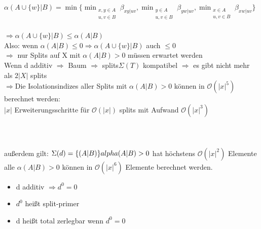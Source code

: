 $\alpha(A\cup\{w\}|B)=\min \{ \displaystyle\min_{\substack{x,y \in A \\ u,v \in B}} \beta_{xy|uv}, \displaystyle\min_{\substack{y \in A \\ u,v \in B}} \beta_{yw|uv}, \displaystyle\min_{\substack{x \in A \\ u,v \in B}} \beta_{xw|uv} \}$
\\\\
$\Rightarrow \alpha(A \cup \{w\}|B) \leq \alpha(A|B)$\\
Also: wenn $\alpha(A|B) \leq 0 \Rightarrow \alpha(A \cup \{w\}|B)$ auch $\leq0$\\ 
$\Rightarrow$ nur Splits auf X mit $\alpha(A|B)>0$ müssen erwartet werden\\
Wenn d additiv $\Rightarrow$ Baum $\Rightarrow$ splits$\Sigma(T)$ kompatibel $\Rightarrow$ es gibt nicht mehr als $2|X|$ splits\\
$\Rightarrow$Die Isolationsindizes aller Splits mit $\alpha(A|B)>0$ können in $\mathcal{O}(|x|^5)$ berechnet werden:\\
$|x|$ Erweiterungsschritte für $\mathcal{O}(|x|)$ splits mit Aufwand $\mathcal{O}(|x|^3)$\\\\

\\\\
außerdem gilt:
$\Sigma(d)=\{(A|B)\}\\alpha(A|B)>0$ hat höchstens $\mathcal{O}(|x|^2)$ Elemente\\
alle $\alpha(A|B)>0$ können in $\mathcal{O}(|x|^6)$ Elemente berechnet werden.\\
\begin{itemize}
	\item d additiv $\Rightarrow d^0=0$
	\item $d^0$ heißt split-primer
	\item d heißt total zerlegbar wenn $d^0=0$
\end{itemize}

